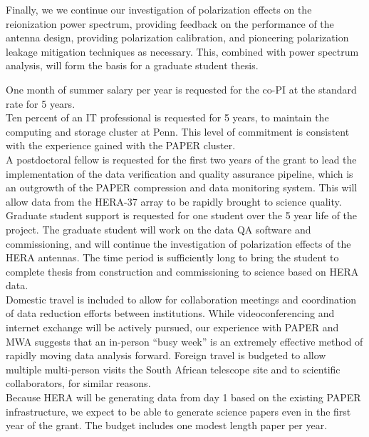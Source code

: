 \documentclass[onecolumn,11pt]{aastex}
\begin{document}
Finally, we we continue our investigation of polarization effects on the reionization power spectrum, providing feedback on the performance of the antenna design, providing polarization calibration, and pioneering polarization leakage mitigation techniques as necessary.  This, combined with power spectrum analysis, will form the basis for a graduate student thesis.

 One month of summer salary per year is requested for the
co-PI at the standard rate for 5 years.\\

 Ten percent of an IT professional is requested for 5 years, to maintain the computing and storage cluster at Penn.  This level of commitment is consistent with the experience gained with the PAPER cluster.\\

 A postdoctoral fellow is requested for the first two years of the grant to lead the implementation of the data verification and quality assurance pipeline, which is an outgrowth of the PAPER compression and data monitoring system.  This will allow data from the HERA-37 array to be rapidly brought to science quality.\\ 

 Graduate student support is requested for
one student over the 5 year life of the project.  The graduate student will work on the data QA software and commissioning, and will continue the investigation of polarization effects of the HERA antennas.  The time period is sufficiently long to bring the student to complete thesis from construction and commissioning to science based on HERA data.  \\

 Domestic travel is included to allow for collaboration meetings and coordination of data reduction efforts between institutions.  While videoconferencing and internet exchange will be actively pursued, our experience with PAPER and MWA suggests that an in-person ``busy week'' is an extremely effective method of rapidly moving data analysis forward.  Foreign travel is budgeted to allow multiple multi-person visits the South African telescope site and to scientific collaborators, for similar reasons.\\

 Because HERA will be generating data from day 1 based on the existing PAPER infrastructure, we expect to be able to generate science papers even in the first year of the grant.  The budget includes one modest length paper per year.
\end{document}
